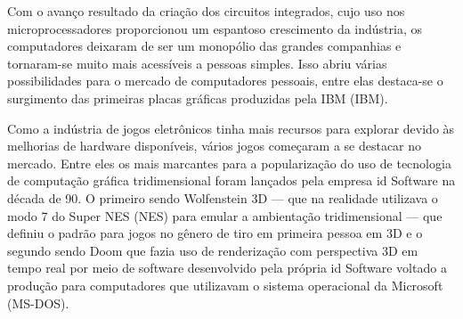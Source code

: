 	\begin{figure}[h!]
		\centering
	\end{figure}
	\nocite{figura1}
	
Com o avanço resultado da criação dos circuitos integrados, cujo uso nos microprocessadores proporcionou um espantoso crescimento da indústria, os computadores deixaram de ser um monopólio das grandes companhias e tornaram-se muito mais acessíveis a pessoas simples. Isso abriu várias possibilidades para o mercado de computadores pessoais, entre elas destaca-se o surgimento das primeiras placas gráficas produzidas pela IBM (\acrlong{IBM}).

%     
	
Como a indústria de jogos eletrônicos tinha mais recursos para explorar devido às melhorias de hardware disponíveis, vários jogos começaram a se destacar no mercado. Entre eles os mais marcantes para a popularização do uso de tecnologia de computação gráfica tridimensional foram lançados pela empresa id Software na década de 90. O primeiro sendo Wolfenstein 3D --- que na realidade utilizava o modo 7 do Super NES (\acrlong{NES}) para emular a ambientação tridimensional --- que definiu o padrão para jogos no gênero de tiro em primeira pessoa em 3D e o segundo sendo Doom que fazia uso de renderização com perspectiva 3D em tempo real por meio de software desenvolvido pela própria id Software voltado a produção para computadores que utilizavam o sistema operacional da Microsoft (\acrshort{MS-DOS}).

